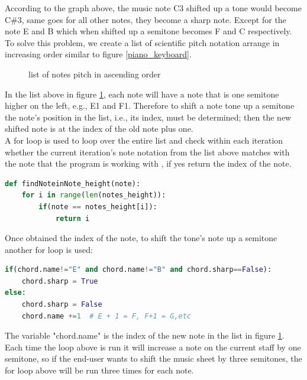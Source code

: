 \documentclass[a4paper,12pt]{report}
\begin{document}
According to the graph above, the music note C3 shifted up a tone would become
C\#3, same goes for all other notes, they become a sharp note. Except for the note
E and B which when shifted up a semitone becomes F and C respectively.\\

To solve this problem, we create a list of scientific pitch notation arrange in
increasing order similar to figure \ref{piano_keyboard}.\\

\begin{figure}[h]
\noindent{}
\caption{list of notes pitch in ascending order}
\label{list: note pitch increase}
\end{figure}


\medskip

In the list above in figure \ref{list: note pitch increase}, each note will have
a note that is one semitone higher on the left, e.g., E1 and F1.  Therefore to
shift a note tone up a semitone the note's position in the list, i.e.,
its index, must be determined; then the new shifted note is at the index of
the old note plus one.\\

A for loop is used to loop over the entire list and check within each
iteration whether the current iteration's note notation from the list above
matches with the note that the program is working with , if yes return the index
of the note.\\

\begin{lstlisting}[language=Python]
def findNoteinNote_height(note):
    for i in range(len(notes_height)):
        if(note == notes_height[i]):
            return i
\end{lstlisting}
\medskip

Once obtained the index of the note, to shift the tone's note up a semitone 
another for loop is used:\\

\begin{lstlisting}[language=Python]
if(chord.name!="E" and chord.name!="B" and chord.sharp==False):
    chord.sharp = True
else:
    chord.sharp = False
    chord.name +=1  # E + 1 = F, F+1 = G,etc
\end{lstlisting}
\medskip
The variable "chord.name" is the index of the new note in the list in figure
\ref{list: note pitch increase}.  Each time the loop above is run it will
increase a note on the current staff by one semitone, so if the end-user wants to shift
the music sheet by three semitones, the for loop above will be run three
times for each note.\\
\end{document}
